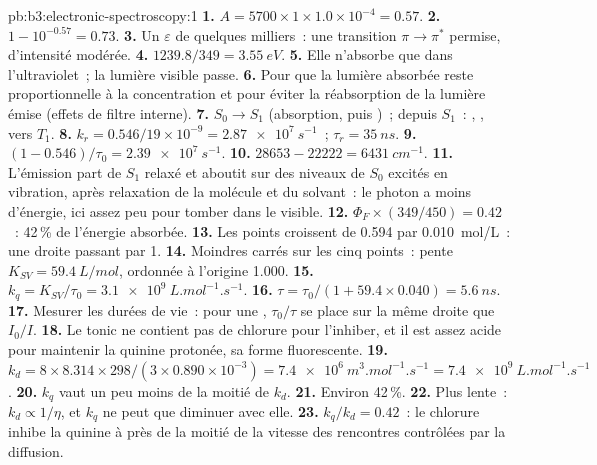 \begin{solution}{pb:b3:electronic-spectroscopy:1}
\textbf{1.} $A = 5700 \times 1 \times 1.0\times10^{-4} = 0.57$.
\textbf{2.} $1 - 10^{-0.57} = 0.73$.
\textbf{3.} Un $\varepsilon$ de quelques milliers~: une transition
$\pi\to\pi^*$ permise, d'intensité modérée.
\textbf{4.} $1239.8/349 = \qty{3.55}{eV}$.
\textbf{5.} Elle n'absorbe que dans l'ultraviolet~; la lumière visible
passe.
\textbf{6.} Pour que la lumière absorbée reste proportionnelle à la
concentration et pour éviter la réabsorption de la lumière émise (effets
de filtre interne).
\textbf{7.} $S_0 \to S_1$ (absorption, puis )~;
depuis $S_1$~: , , 
vers $T_1$.
\textbf{8.} $k_r = 0.546/19 \times 10^{-9} = \qty{2.87e7}{s^{-1}}$~; $\tau_r = \qty{35}{ns}$.
\textbf{9.} $(1 - 0.546)/\tau_0 = \qty{2.39e7}{s^{-1}}$.
\textbf{10.} $28653 - 22222 = \qty{6431}{cm^{-1}}$.
\textbf{11.} L'émission part de $S_1$ relaxé et aboutit sur des niveaux
de $S_0$ excités en vibration, après relaxation de la molécule et du
solvant~: le photon a moins d'énergie, ici assez peu pour tomber dans le
visible.
\textbf{12.} $\Phi_F \times (349/450) = 0.42$~: 42\,\% de l'énergie
absorbée.
\textbf{13.} Les points croissent de 0.594 par \qty{0.010}{mol/L}~: une
droite passant par 1.
\textbf{14.} Moindres carrés sur les cinq points~: pente $K_{SV} = \qty{59.4}{L/mol}$,
ordonnée à l'origine 1.000.
\textbf{15.} $k_q = K_{SV}/\tau_0 = \qty{3.1e9}{L.mol^{-1}.s^{-1}}$.
\textbf{16.} $\tau = \tau_0/(1 + 59.4 \times 0.040) = \qty{5.6}{ns}$.
\textbf{17.} Mesurer les durées de vie~: pour une ,
$\tau_0/\tau$ se place sur la même droite que $I_0/I$.
\textbf{18.} Le tonic ne contient pas de chlorure pour l'inhiber, et il
est assez acide pour maintenir la quinine protonée, sa forme
fluorescente.
\textbf{19.} $k_d = 8 \times 8.314 \times 298/(3 \times 0.890\times10^{-3}) =
\qty{7.4e6}{m^3.mol^{-1}.s^{-1}} = \qty{7.4e9}{L.mol^{-1}.s^{-1}}$.
\textbf{20.} $k_q$ vaut un peu moins de la moitié de $k_d$.
\textbf{21.} Environ 42\,\%.
\textbf{22.} Plus lente~: $k_d \propto 1/\eta$, et $k_q$ ne peut que
diminuer avec elle.
\textbf{23.} \textbf{$k_q/k_d = 0.42$}~: le chlorure inhibe la quinine à
près de la moitié de la vitesse des rencontres contrôlées par la
diffusion.
\end{solution}
